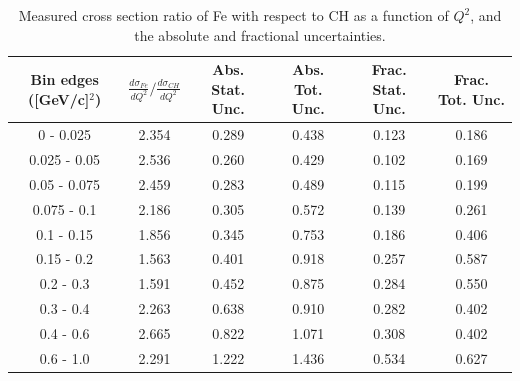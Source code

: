 \documentclass[aps,prl,twocolumn,superscriptaddress,nofootinbib]{revtex4-1}
\begin{document}
\begin{table}[h!]
  \centering
  \caption{Measured cross section ratio of Fe with respect to CH as a function
  of $Q^{2}$,  and the absolute and fractional uncertainties.}
    \begin{tabular}{c||c||c|c||c|c}
      Bin edges ([GeV/c]$^{2}$) & $\frac{d\sigma_{Fe}}{dQ^{2}}/\frac{d\sigma_{CH}}{dQ^{2}}$ & Abs. Stat. Unc. & Abs. Tot. Unc. & Frac. Stat. Unc. & Frac. Tot. Unc. \\
      \hline\hline
         0 - 0.025 & 2.354 & 0.289 & 0.438 & 0.123 & 0.186 \\
      0.025 - 0.05 & 2.536 & 0.260 & 0.429 & 0.102 & 0.169 \\
      0.05 - 0.075 & 2.459 & 0.283 & 0.489 & 0.115 & 0.199 \\
       0.075 - 0.1 & 2.186 & 0.305 & 0.572 & 0.139 & 0.261 \\
        0.1 - 0.15 & 1.856 & 0.345 & 0.753 & 0.186 & 0.406 \\
        0.15 - 0.2 & 1.563 & 0.401 & 0.918 & 0.257 & 0.587 \\
         0.2 - 0.3 & 1.591 & 0.452 & 0.875 & 0.284 & 0.550 \\
         0.3 - 0.4 & 2.263 & 0.638 & 0.910 & 0.282 & 0.402 \\
         0.4 - 0.6 & 2.665 & 0.822 & 1.071 & 0.308 & 0.402 \\
         0.6 - 1.0 & 2.291 & 1.222 & 1.436 & 0.534 & 0.627 \\
    \end{tabular}
  \label{table:Q2XSecRatio_Fe}
\end{table}
\end{document}
